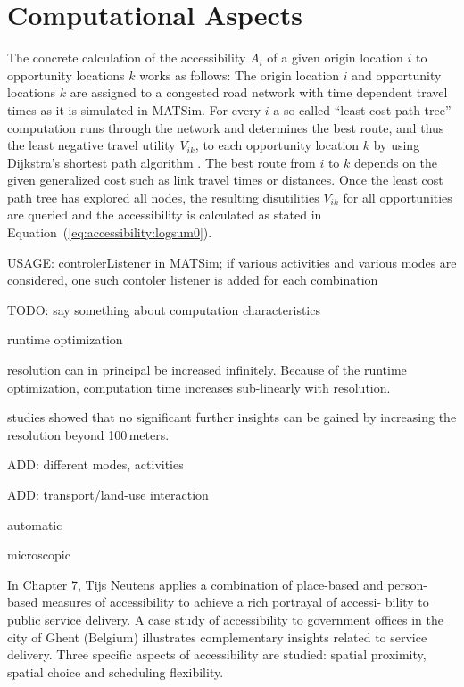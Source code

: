 

\section{Computational Aspects}

The concrete calculation of the accessibility $A_i$ of a given origin location $i$ to opportunity locations $k$ works as 
follows: The origin location $i$ and opportunity locations $k$ are assigned to a congested road network with time dependent 
travel times as it is simulated in MATSim. For every $i$ a so-called ``least cost path tree'' computation runs through the 
network and determines the best route, and thus the least negative travel utility $V_{ik}$, to each opportunity location 
$k$ by using Dijkstra's shortest path algorithm \citep{Dijkstra1959ShortestPath}. The best route from $i$ to $k$ depends 
on the given generalized cost such as link travel times or distances. Once the least cost path tree has explored all 
nodes, the resulting disutilities $V_{ik}$ for all opportunities are queried and the accessibility is calculated as 
stated in Equation~(\ref{eq:accessibility:logsum0}).


USAGE: controlerListener in MATSim; if various activities and various modes are considered, one such contoler listener 
is added for each combination


TODO: say something about computation characteristics

runtime optimization

resolution can in principal be increased infinitely. Because of the runtime optimization, computation time increases 
sub-linearly with resolution.

studies showed that no significant further insights can be gained by increasing the resolution beyond 100\,meters.

ADD: different modes, activities

ADD: transport/land-use interaction

automatic

microscopic




In Chapter 7, Tijs Neutens applies a combination of place-based and person-based measures of accessibility to achieve 
a rich portrayal of accessi- bility to public service delivery. A case study of accessibility to government offices 
in the city of Ghent (Belgium) illustrates complementary insights related to service delivery. Three specific aspects 
of accessibility are studied: spatial proximity, spatial choice and scheduling flexibility.

